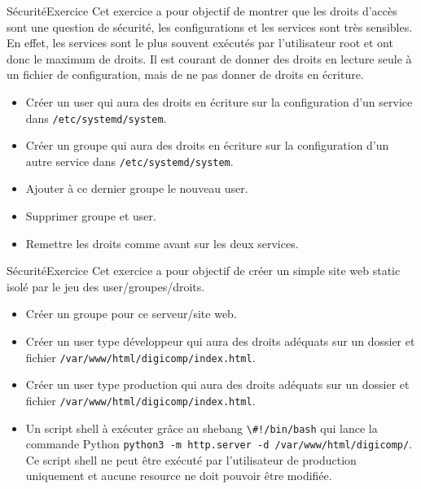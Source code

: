 \documentclass{beamer}
\begin{document}
    \begin{frame}{Sécurité}{Exercice \execcounterdispinc}
        Cet exercice a pour objectif de montrer que les droits d'accès sont une question de sécurité, les configurations et les services sont très sensibles.
        En effet, les services sont le plus souvent exécutés par l'utilisateur root et ont donc le maximum de droits.
        \bigbreak
        Il est courant de donner des droits en lecture seule à un fichier de configuration, mais de ne pas donner de droits en écriture.
        \begin{itemize}
            \item Créer un user qui aura des droits en écriture sur la configuration d'un service dans \lstinline{/etc/systemd/system}.
            \item Créer un groupe qui aura des droits en écriture sur la configuration d'un autre service dans \lstinline{/etc/systemd/system}.
            \item Ajouter à ce dernier groupe le nouveau user.
            \item Supprimer groupe et user.
            \item Remettre les droits comme avant sur les deux services.
        \end{itemize}
    \end{frame}

    \begin{frame}{Sécurité}{Exercice \execcounterdispinc}
        Cet exercice a pour objectif de créer un simple site web static isolé par le jeu des user/groupes/droits.
        \begin{itemize}
            \item Créer un groupe pour ce serveur/site web.
            \item Créer un user type développeur qui aura des droits adéquats sur un dossier et fichier \lstinline{/var/www/html/digicomp/index.html}.
            \item Créer un user type production qui aura des droits adéquats sur un dossier et fichier \lstinline{/var/www/html/digicomp/index.html}.
            \item Un script shell à exécuter grâce au shebang \lstinline{\#!/bin/bash} qui lance la commande Python \lstinline{python3 -m http.server -d /var/www/html/digicomp/}.
            Ce script shell ne peut être exécuté par l'utilisateur de production uniquement et aucune resource ne doit pouvoir être modifiée.
        \end{itemize}
    \end{frame}
\end{document}
